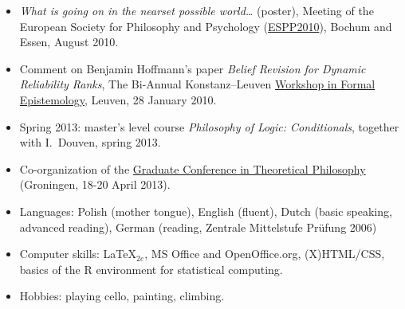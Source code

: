 \documentclass[a4paper,12pt]{article}
\begin{document}
\begin{small}
\begin{itemize}
  \item \emph{What is going on in the nearset possible world\ldots}
    (poster), Meeting of the European Society for Philosophy and
    Psychology
    (\href{http://www.ruhr-uni-bochum.de/philosophy/espp2010/index.html}{ESPP2010}),
    Bochum and Essen, August 2010.

  \item Comment on Benjamin Hoffmann's paper \emph{Belief Revision for
      Dynamic Reliability Ranks}, The Bi-Annual Konstanz--Leuven
    \href{http://formalphilosophy.org/node/580}{Workshop in Formal
      Epistemology}, Leuven, 28 January 2010.
  \end{itemize}

  



  
  
  \begin{itemize}
  \item Spring 2013: master's level course \emph{Philosophy of Logic:
      Conditionals}, together with I.~Douven, spring 2013.
  \end{itemize}

  
  \begin{itemize}
  \item Co-organization of the
    \href{http://www.philos.rug.nl/GCTP2013/}{Graduate Conference in
      Theoretical Philosophy} (Groningen, 18-20 April 2013).
  \end{itemize}


  \begin{itemize}
  \item Languages: Polish (mother tongue), English (fluent), Dutch
    (basic speaking, advanced reading), German (reading, Zentrale
    Mittelstufe Pr\"ufung 2006)
  \item Computer skills: \LaTeX$_{2e}$, MS Office and OpenOffice.org,
    (X)HTML/CSS, basics of the R environment for statistical
    computing.

  \item Hobbies: playing cello, painting, climbing.
  \end{itemize}


\end{small}
\end{document}
